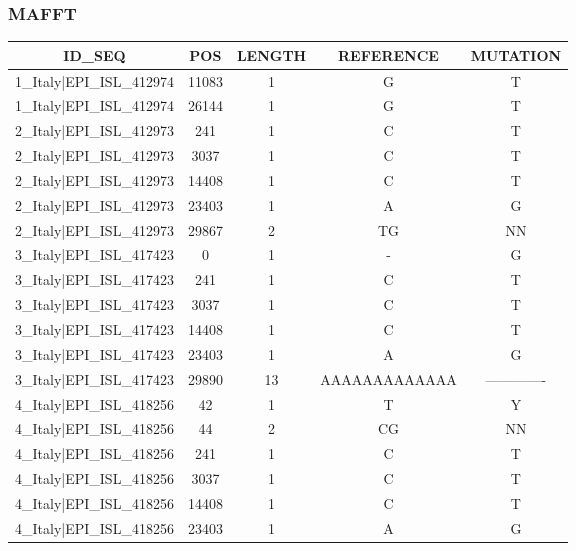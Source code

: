 \documentclass[a4paper,10pt]{article}
\begin{document}
\newpage

\subsubsection{MAFFT}

\begin{longtable}{@{}ccccc@{}}
\toprule
\textbf{ID\_SEQ} & \textbf{POS} & \textbf{LENGTH} & \textbf{REFERENCE} & \textbf{MUTATION} \\* \midrule
\endfirsthead
%
\cline{1-5}
\endhead
%
1\_Italy|EPI\_ISL\_412974 & 11083 & 1 & G & T \\* \midrule
1\_Italy|EPI\_ISL\_412974 & 26144 & 1 & G & T \\* \midrule
2\_Italy|EPI\_ISL\_412973 & 241 & 1 & C & T \\* \midrule
2\_Italy|EPI\_ISL\_412973 & 3037 & 1 & C & T \\* \midrule
2\_Italy|EPI\_ISL\_412973 & 14408 & 1 & C & T \\* \midrule
2\_Italy|EPI\_ISL\_412973 & 23403 & 1 & A & G \\* \midrule
2\_Italy|EPI\_ISL\_412973 & 29867 & 2 & TG & NN \\* \midrule
3\_Italy|EPI\_ISL\_417423 & 0 & 1 & - & G \\* \midrule
3\_Italy|EPI\_ISL\_417423 & 241 & 1 & C & T \\* \midrule
3\_Italy|EPI\_ISL\_417423 & 3037 & 1 & C & T \\* \midrule
3\_Italy|EPI\_ISL\_417423 & 14408 & 1 & C & T \\* \midrule
3\_Italy|EPI\_ISL\_417423 & 23403 & 1 & A & G \\* \midrule
3\_Italy|EPI\_ISL\_417423 & 29890 & 13 & AAAAAAAAAAAAA & ------------- \\* \midrule
4\_Italy|EPI\_ISL\_418256 & 42 & 1 & T & Y \\* \midrule
4\_Italy|EPI\_ISL\_418256 & 44 & 2 & CG & NN \\* \midrule
4\_Italy|EPI\_ISL\_418256 & 241 & 1 & C & T \\* \midrule
4\_Italy|EPI\_ISL\_418256 & 3037 & 1 & C & T \\* \midrule
4\_Italy|EPI\_ISL\_418256 & 14408 & 1 & C & T \\* \midrule
4\_Italy|EPI\_ISL\_418256 & 23403 & 1 & A & G \\* \midrule

\end{longtable}
\end{document}
